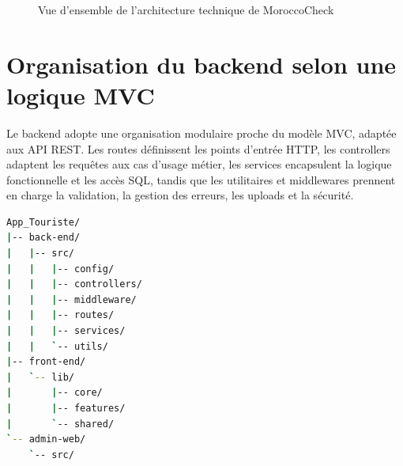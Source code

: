 ﻿\documentclass[12pt,a4paper]{report}
\begin{document}
\begin{figure}[H]
  \centering
  \caption{Vue d'ensemble de l'architecture technique de MoroccoCheck}
\end{figure}

\section{Organisation du backend selon une logique MVC}
Le backend adopte une organisation modulaire proche du mod\`ele MVC, adapt\'ee aux API REST. Les routes d\'efinissent les points d'entr\'ee HTTP, les controllers adaptent les requ\^etes aux cas d'usage m\'etier, les services encapsulent la logique fonctionnelle et les acc\`es SQL, tandis que les utilitaires et middlewares prennent en charge la validation, la gestion des erreurs, les uploads et la s\'ecurit\'e.

\begin{lstlisting}[language=bash,caption={Arborescence simplifi\'ee du projet}]
App_Touriste/
|-- back-end/
|   |-- src/
|   |   |-- config/
|   |   |-- controllers/
|   |   |-- middleware/
|   |   |-- routes/
|   |   |-- services/
|   |   `-- utils/
|-- front-end/
|   `-- lib/
|       |-- core/
|       |-- features/
|       `-- shared/
`-- admin-web/
    `-- src/
\end{lstlisting}
\end{document}
